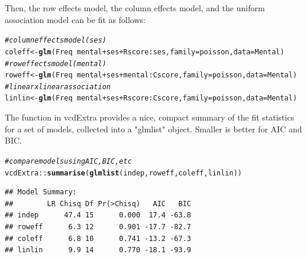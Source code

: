 \documentclass[10pt,twoside]{article}\usepackage[]{graphicx}\usepackage[]{color}
\makeatletter
\newcommand{\hlcom}[1]{\textcolor[rgb]{0.678,0.584,0.686}{\textit{#1}}}%
\newcommand{\hlopt}[1]{\textcolor[rgb]{0,0,0}{#1}}%
\newcommand{\hlstd}[1]{\textcolor[rgb]{0.345,0.345,0.345}{#1}}%
\newcommand{\hlkwb}[1]{\textcolor[rgb]{0.69,0.353,0.396}{#1}}%
\newcommand{\hlkwc}[1]{\textcolor[rgb]{0.333,0.667,0.333}{#1}}%
\newcommand{\hlkwd}[1]{\textcolor[rgb]{0.737,0.353,0.396}{\textbf{#1}}}%
\newenvironment{kframe}{%
 \def\at@end@of@kframe{}%
 \ifinner\ifhmode%
  \def\at@end@of@kframe{\end{minipage}}%
  \begin{minipage}{\columnwidth}%
 \fi\fi%
 \def\FrameCommand##1{\hskip\@totalleftmargin \hskip-\fboxsep
 \colorbox{shadecolor}{##1}\hskip-\fboxsep
     \hskip-\linewidth \hskip-\@totalleftmargin \hskip\columnwidth}%
 \MakeFramed {\advance\hsize-\width
   \@totalleftmargin\z@ \linewidth\hsize
   \@setminipage}}%
 {\par\unskip\endMakeFramed%
 \at@end@of@kframe}
\newenvironment{knitrout}{}{} %
\newcommand{\class}[1]{\textsf{"#1"}}
\newcommand{\codefun}[1]{\code{#1()}}
\newcommand{\pkg}[1]{{\normalfont\fontseries{b}\selectfont #1}}
\makeatother
\begin{document}
Then, the row effects model, the column effects model, and the uniform association
model can be fit as follows:
\begin{knitrout}
\color{fgcolor}\begin{kframe}
\begin{alltt}
\hlcom{# column effects model (ses)}
\hlstd{coleff} \hlkwb{<-} \hlkwd{glm}\hlstd{(Freq} \hlopt{~} \hlstd{mental} \hlopt{+} \hlstd{ses} \hlopt{+} \hlstd{Rscore}\hlopt{:}\hlstd{ses,} \hlkwc{family} \hlstd{= poisson,} \hlkwc{data} \hlstd{= Mental)}
\hlcom{# row effects model (mental)}
\hlstd{roweff} \hlkwb{<-} \hlkwd{glm}\hlstd{(Freq} \hlopt{~} \hlstd{mental} \hlopt{+} \hlstd{ses} \hlopt{+} \hlstd{mental}\hlopt{:}\hlstd{Cscore,} \hlkwc{family} \hlstd{= poisson,} \hlkwc{data} \hlstd{= Mental)}
\hlcom{# linear x linear association}
\hlstd{linlin} \hlkwb{<-} \hlkwd{glm}\hlstd{(Freq} \hlopt{~} \hlstd{mental} \hlopt{+} \hlstd{ses} \hlopt{+} \hlstd{Rscore}\hlopt{:}\hlstd{Cscore,} \hlkwc{family} \hlstd{= poisson,} \hlkwc{data} \hlstd{= Mental)}
\end{alltt}
\end{kframe}
\end{knitrout}

The \codefun{summarize} function in \pkg{vcdExtra} provides a nice, compact summary of the
fit statistics for a set of models, collected into a \class{glmlist} object.
Smaller is better for AIC and BIC.
\begin{knitrout}
\color{fgcolor}\begin{kframe}
\begin{alltt}
\hlcom{# compare models using AIC, BIC, etc}
\hlstd{vcdExtra::}\hlkwd{summarise}\hlstd{(}\hlkwd{glmlist}\hlstd{(indep, roweff, coleff, linlin))}
\end{alltt}
\begin{verbatim}
## Model Summary:
##        LR Chisq Df Pr(>Chisq)   AIC   BIC
## indep      47.4 15      0.000  17.4 -63.8
## roweff      6.3 12      0.901 -17.7 -82.7
## coleff      6.8 10      0.741 -13.2 -67.3
## linlin      9.9 14      0.770 -18.1 -93.9
\end{verbatim}
\end{kframe}
\end{knitrout}
\end{document}
